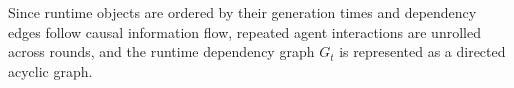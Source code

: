 \documentclass[letterpaper]{article} %
\begin{document}
Since runtime objects are ordered by their generation times and dependency edges follow causal information flow, repeated agent interactions are unrolled across rounds, and the runtime dependency graph \(G_t\) is represented as a directed acyclic graph.



\end{document}
